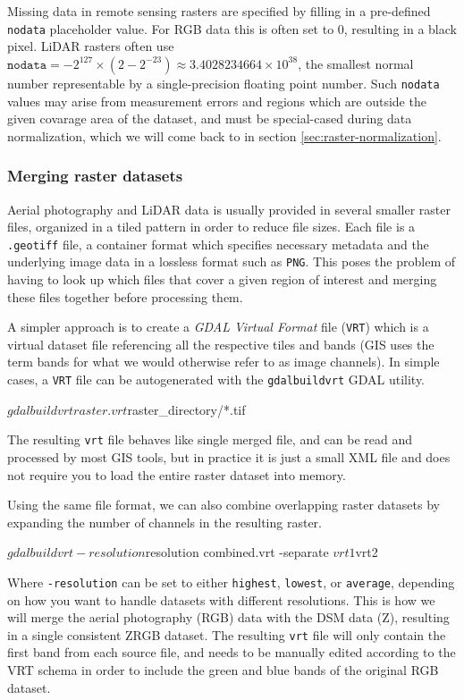 Missing data in remote sensing rasters are specified by filling in a pre-defined \texttt{nodata} placeholder value.
For RGB data this is often set to $0$, resulting in a black pixel.
LiDAR rasters often use $\texttt{nodata} = -2^{127} \times (2 - 2^{-23}) \approx 3.4028234664 \times 10^{38}$, the smallest normal number representable by a single-precision floating point number.
Such \texttt{nodata} values may arise from measurement errors and regions which are outside the given covarage area of the dataset, and must be special-cased during data normalization, which we will come back to in section \ref{sec:raster-normalization}.

\subsubsection*{Merging raster datasets}

Aerial photography and LiDAR data is usually provided in several smaller raster files, organized in a tiled pattern in order to reduce file sizes.
Each file is a \texttt{.geotiff} file, a container format which specifies necessary metadata and the underlying image data in a lossless format such as \texttt{PNG}.
This poses the problem of having to look up which files that cover a given region of interest and merging these files together before processing them.

A simpler approach is to create a \textit{GDAL Virtual Format} file (\texttt{VRT}) which is a virtual dataset file referencing all the respective tiles and bands (GIS uses the term bands for what we would otherwise refer to as image channels).
In simple cases, a \texttt{VRT} file can be autogenerated with the \texttt{gdalbuildvrt} GDAL utility.

\begin{shellcode}
$ gdalbuildvrt raster.vrt ${raster_directory}/*.tif
\end{shellcode}
%
The resulting \texttt{vrt} file behaves like single merged file, and can be read and processed by most GIS tools, but in practice it is just a small XML file and does not require you to load the entire raster dataset into memory.

Using the same file format, we can also combine overlapping raster datasets by expanding the number of channels in the resulting raster.

\begin{shellcode}
$ gdalbuildvrt -resolution ${resolution} combined.vrt -separate ${vrt1} ${vrt2} 
\end{shellcode}
%
Where \texttt{-resolution} can be set to either \texttt{highest}, \texttt{lowest}, or \texttt{average}, depending on how you want to handle datasets with different resolutions.
This is how we will merge the aerial photography (RGB) data with the DSM data (Z), resulting in a single consistent ZRGB dataset.
The resulting \texttt{vrt} file will only contain the first band from each source file, and needs to be manually edited according to the VRT schema \cite{vrt_schema_2015} in order to include the green and blue bands of the original RGB dataset.
